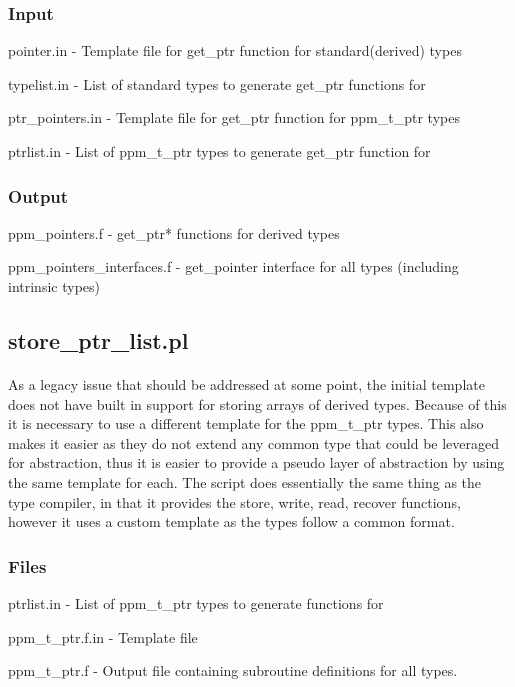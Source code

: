 \documentclass{article}
\begin{document}
\subsubsection{Input}
\begin{list}{}{}
\item pointer.in - Template file for get\_ptr function for standard(derived) types
\item typelist.in - List of standard types to generate get\_ptr functions for
\item ptr\_pointers.in - Template file for get\_ptr function for ppm\_t\_ptr types
\item ptrlist.in - List of ppm\_t\_ptr types to generate get\_ptr function for
\end{list}
\subsubsection{Output}
\begin{list}{}{}
\item ppm\_pointers.f - get\_ptr* functions for derived types
\item ppm\_pointers\_interfaces.f - get\_pointer interface for all types (including intrinsic types)
\end{list}

\subsection{store\_ptr\_list.pl}
\paragraph{}
As a legacy issue that should be addressed at some point, the initial template does not have built in support for storing arrays of derived types. Because of this it is necessary to use a different template for the ppm\_t\_ptr types. This also makes it easier as they do not extend any common type that could be leveraged for abstraction, thus it is easier to provide a pseudo layer of abstraction by using the same template for each. The script does essentially the same thing as the type compiler, in that it provides the store, write, read, recover functions, however it uses a custom template as the types follow a common format.
\subsubsection{Files}
\begin{list}{}{}
\item ptrlist.in - List of ppm\_t\_ptr types to generate functions for
\item ppm\_t\_ptr.f.in - Template file
\item ppm\_t\_ptr.f - Output file containing subroutine definitions for all types.
\end{list}
\end{document}
